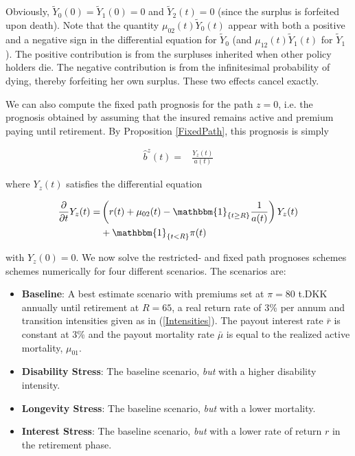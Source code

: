 \documentclass{article}
\newcommand{\1}[1]{\mathbbm{1}_{\left\lbrace #1 \right\rbrace}}
\theoremstyle{break}
\theoremstyle{remark}
\numberwithin{equation}{section}
\begin{document}
Obviously, $\tilde{Y}_0(0)=\tilde{Y}_1(0)=0$ and $\tilde{Y}_2(t)=0$ (since the surplus is forfeited upon death). Note that the quantity $\mu_{02}(t) \tilde{Y}_0(t)$ appear with both a positive and a negative sign in the differential equation for $\tilde{Y}_0$ (and $\mu_{12}(t) \tilde{Y}_1(t)$ for $\tilde{Y}_1$). The positive contribution is from the surpluses inherited when other policy holders die. The negative contribution is from the infinitesimal probability of dying, thereby forfeiting her own surplus. These two effects cancel exactly.

We can also compute the fixed path prognosis for the path $z=0$, i.e. the prognosis obtained by assuming that the insured remains active and premium paying until retirement.  By Proposition \ref{FixedPath}, this prognosis is simply

\begin{align} \label{Naja2}
	\hat{b}^z(t) =& \frac{Y_z(t)}{a(t)}
\end{align}

where $Y_z(t)$ satisfies the differential equation

\begin{align} \label{Jaja2}
\begin{split}
		\frac{\partial}{\partial t}Y_z(t) =& \left( r(t) + \mu_{02}(t) - \1{t \geq R} \frac{1}{a(t)}\right) Y_z(t) \\
	&+ \1{t<R} \pi(t)
\end{split}
\end{align}

with $Y_z(0) = 0$. We now solve the restricted- and fixed path prognoses schemes schemes numerically for four different scenarios. The scenarios are:

\begin{itemize}
	\item \textbf{Baseline}: A best estimate scenario with premiums set at $\pi = 80$ t.DKK annually until retirement at $R=65$, a real return rate of 3\% per annum and transition intensities given as in (\ref{Intensities}). The payout interest rate $\bar{r}$ is constant at 3\% and the payout mortality rate $\bar{\mu}$ is equal to the realized active mortality, $\mu_{01}$.
	\item \textbf{Disability Stress}: The baseline scenario, \textit{but} with a higher disability intensity.
	\item \textbf{Longevity Stress}: The baseline scenario, \textit{but} with a lower mortality.
	\item \textbf{Interest Stress}: The baseline scenario, \textit{but} with a lower rate of return $r$ in the retirement phase.
\end{itemize}
\end{document}
